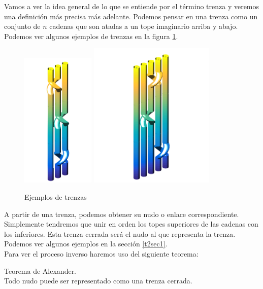 Vamos a ver la idea general de lo que se entiende por el término trenza y veremos una definición más precisa más adelante. Podemos pensar en una trenza como un conjunto de $n$ cadenas que son atadas a un tope imaginario arriba y abajo. Podemos ver algunos ejemplos de trenzas en la figura \ref{ntren1}.\\
   \begin{figure}[h!]
   	\centering
   	\includegraphics[width=3.5cm]{itrenzas/t4.png}
   	\space
   	\includegraphics[width=6cm]{itrenzas/t7.png}
   	\caption{Ejemplos de trenzas}
   	\label{ntren1} 
   \end{figure} 

A partir de una trenza, podemos obtener su nudo o enlace correspondiente. Simplemente tendremos que unir en orden  los topes superiores de las cadenas con los inferiores. Esta trenza cerrada será el nudo al que representa la trenza. Podemos ver algunos ejemplos en la sección \ref{t2sec1}.\\

Para ver el proceso inverso haremos uso del siguiente teorema:
\begin{teo}Teorema de Alexander.\\
	Todo nudo puede ser representado como una trenza cerrada.
\end{teo}

